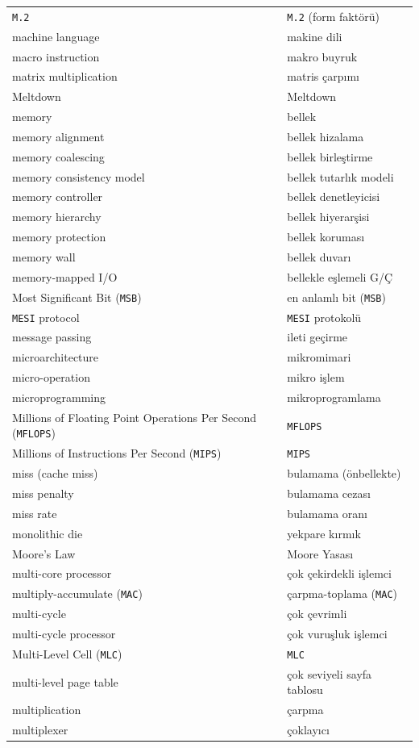 {\begin{longtable}{@{}p{7.6cm}p{7.6cm}@{}}
\texttt{M.2} & \texttt{M.2} (form faktörü) \\
machine language & makine dili \\
macro instruction & makro buyruk \\
matrix multiplication & matris çarpımı \\
Meltdown & Meltdown \\
memory & bellek \\
memory alignment & bellek hizalama \\
memory coalescing & bellek birleştirme \\
memory consistency model & bellek tutarlık modeli \\
memory controller & bellek denetleyicisi \\
memory hierarchy & bellek hiyerarşisi \\
memory protection & bellek koruması \\
memory wall & bellek duvarı \\
memory-mapped I/O & bellekle eşlemeli G/Ç \\
Most Significant Bit (\texttt{MSB}) & en anlamlı bit (\texttt{MSB}) \\
\texttt{MESI} protocol & \texttt{MESI} protokolü \\
message passing & ileti geçirme \\
microarchitecture & mikromimari \\
micro-operation & mikro işlem \\
microprogramming & mikroprogramlama \\
Millions of Floating Point Operations Per Second (\texttt{MFLOPS}) & \texttt{MFLOPS} \\
Millions of Instructions Per Second (\texttt{MIPS}) & \texttt{MIPS} \\
miss (cache miss) & bulamama (önbellekte) \\
miss penalty & bulamama cezası \\
miss rate & bulamama oranı \\
monolithic die & yekpare kırmık \\
Moore's Law & Moore Yasası \\
multi-core processor & çok çekirdekli işlemci \\
multiply-accumulate (\texttt{MAC}) & çarpma-toplama (\texttt{MAC}) \\
multi-cycle & çok çevrimli \\
multi-cycle processor & çok vuruşluk işlemci \\
Multi-Level Cell (\texttt{MLC}) & \texttt{MLC} \\
multi-level page table & çok seviyeli sayfa tablosu \\
multiplication & çarpma \\
multiplexer & çoklayıcı \\


\end{longtable}}

